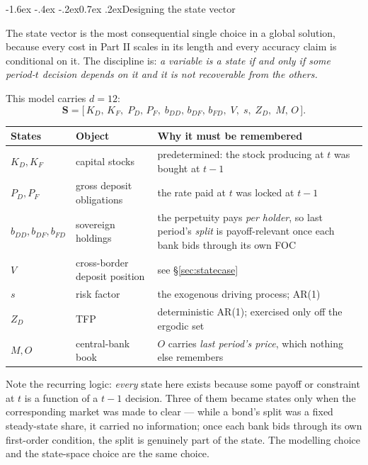 \documentclass[10pt,a4paper]{article}
\makeatletter
\theoremstyle{definition}
\theoremstyle{plain}
\theoremstyle{remark}
\newcommand{\st}{\mathbf{S}}
\renewcommand\section{\@startsection{section}{1}{\z@}%
  {-1.6ex \@plus -.4ex \@minus -.2ex}{0.7ex \@plus.2ex}{\normalfont\large\bfseries}}
\makeatother
\begin{document}
\section{Designing the state vector}
\label{sec:states}

The state vector is the most consequential single choice in a global solution, because every
cost in Part II scales in its length and every accuracy claim is conditional on it. The
discipline is: \emph{a variable is a state if and only if some period-$t$ decision depends on
it and it is not recoverable from the others.}

This model carries $d=12$:
\begin{equation}
  \st = \big[\,K_D,\,K_F,\;P_D,\,P_F,\;b_{DD},\,b_{DF},\,b_{FD},\;V,\;s,\;Z_D,\;M,\,O\,\big].
\end{equation}
\begin{center}\small
\begin{tabular}{@{}llp{}@{}}
\toprule
\textbf{States} & \textbf{Object} & \textbf{Why it must be remembered} \\
\midrule
$K_D, K_F$ & capital stocks & predetermined: the stock producing at $t$ was bought at $t-1$ \\
$P_D, P_F$ & gross deposit obligations & the rate paid at $t$ was locked at $t-1$ \\
$b_{DD},b_{DF},b_{FD}$ & sovereign holdings & the perpetuity pays \emph{per holder}, so last
period's \emph{split} is payoff-relevant once each bank bids through its own FOC \\
$V$ & cross-border deposit position & see \S\ref{sec:statecase} \\
$s$ & risk factor & the exogenous driving process; AR(1) \\
$Z_D$ & TFP & deterministic AR(1); exercised only off the ergodic set \\
$M, O$ & central-bank book & $O$ carries \emph{last period's price}, which nothing else remembers \\
\bottomrule
\end{tabular}
\end{center}

Note the recurring logic: \emph{every} state here exists because some payoff or constraint at
$t$ is a function of a $t{-}1$ decision. Three of them became states only when the
corresponding market was made to clear --- while a bond's split was a fixed steady-state
share, it carried no information; once each bank bids through its own first-order condition,
the split is genuinely part of the state. The modelling choice and the state-space choice are
the same choice.
\end{document}
